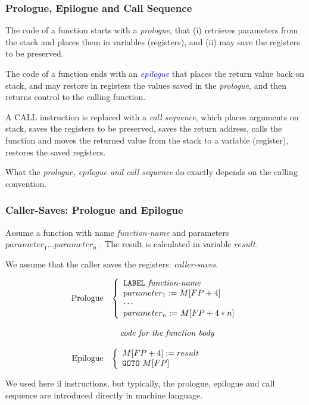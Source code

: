 \documentclass{beamer}
\newcommand{\blue}[1]{\textcolor{Blue}{{#1}}}
\renewcommand{\emph}[1]{\textcolor{structure}{#1}}
\newcommand{\emp}[1]{\textcolor{DikuRed}{ #1}}
\begin{document}
\begin{frame}
\frametitle{Prologue, Epilogue and Call Sequence}

The code of a function starts with a \emph{\em prologue}, that (i) retrieves
parameters from the stack and places them in variables (registers),
and (ii) \alert{may} save the registers to be preserved.

\bigskip

The code of a function ends with an \blue{\em epilogue} that places the return
value back on stack, and \alert{may} restore in registers the values saved in
the {\em prologue}, and then returns control to the calling function.

\bigskip

A CALL instruction is replaced with a \emp{\em call sequence}, which places
arguments on stack, saves the registers to be preserved, saves the
return address, calls the function and moves the returned value from
the stack to a variable (register), restores the saved registers.

\bigskip

What the {\em prologue, epilogue and call sequence} do exactly depends on
the calling convention.


\end{frame}



\begin{frame}
\frametitle{Caller-Saves: Prologue and Epilogue}

Assume a function with name {\it function-name} and parameters
$parameter_1 \ldots parameter_n$ . 
The result is calculated in variable $result$.\smallskip

We assume that the caller saves the registers: {\em caller-saves}.

\vspace{1ex}

\renewcommand{\arraystretch}{0.9}
\[\begin{array}{rl}

\mbox{Prologue} & \left\{
{\begin{array}{l}
{\tt LABEL}~\mbox{\it function-name} \\
parameter_1 := M[FP+4] \\
\cdots \\
parameter_n := M[FP+4*n]
\end{array}}
\right. \\
\\
& ~~~\mbox{\it code for the function body} \\
\\
\mbox{Epilogue} & \left\{
{\begin{array}{l}
M[FP+4] := result \\
{\tt GOTO}~M[FP]
\end{array}}
\right.
\end{array}\]

\vspace{1ex}

We used here {\sc il} instructions, but typically, the prologue, epilogue
and call sequence are introduced directly in machine language.

\end{frame}
\end{document}
